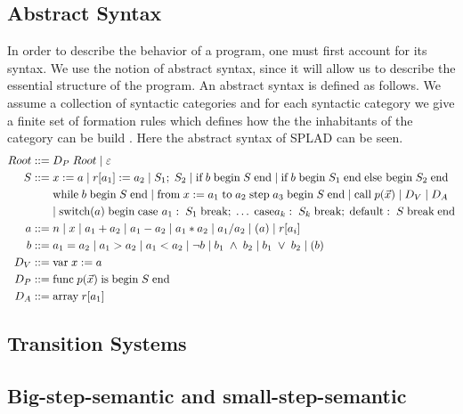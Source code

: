 \subsection{Abstract Syntax}
In order to describe the behavior of a program, one must first account for its syntax. We use the notion of abstract syntax, since it will allow us to describe the essential structure of the program. An abstract syntax is defined as follows. We assume a collection of syntactic categories and for each syntactic category we give a finite set of formation rules which defines how the the inhabitants of the category can be build \citep{HHTree}.
Here the abstract syntax of SPLAD can be seen. 
\begin{align*}
Root ::= \; & D_P \; Root \;| \;\varepsilon \\
S::= \; & x := a \; | \; r[a_1] := a_2 \; | \; S_1; \; S_2 \; | \; \text{if} \; b \; \text{begin} \; S \; \text{end} \; | \; \text{if} \; b \; \text{begin} \; S_1 \; \text{end} \; \text{else begin} \; S_2 \; \text{end} \\
~ & \text{while} \; b \; \text{begin} \; S \; \text{end} \; | \; \text{from} \; x := a_1 \; \text{to} \; a_2 \; \text{step} \; a_3 \; \text{begin} \; S \; \text{end} \; | \; \text{call} \; p(\vec{x}) \; | \; D_V \; | \; D_A \; \\
~ & | \; \text{switch}(a) \; \text{begin} \; \text{case } a_1: \; S_1 \; \text{break}; \; \dots \; \text{case} a_k: \; S_k \; \text{break}; \; \text{default}: \; S \; \text{break} \; \text{end} \\
a::= \; & n \; | \; x \; | \; a_1 + a_2 \; | \; a_1 - a_2 \; | \; a_1 * a_2 \; | \; a_1 / a_2 \; | \; (a) \; | \; r[a_i]\\
b::= \; &a_1 = a_2 \; | \; a_1 > a_2 \; | \; a_1 < a_2 \; | \; \neg b \; | \; b_1 \; \wedge \; b_2 \; | \; b_1 \; \vee \; b_2 \; | \; (b)\\
D_V::= \; & \text{var} \; x := a \\
D_P::= \; & \text{func} \; p(\vec{x}) \; \text{is} \; \text{begin} \; S \; \text{end} \\
D_A::= \; & \text{array} \; r[a_1] \\
\end{align*}

\subsection{Transition Systems}


\subsection{Big-step-semantic and small-step-semantic}

